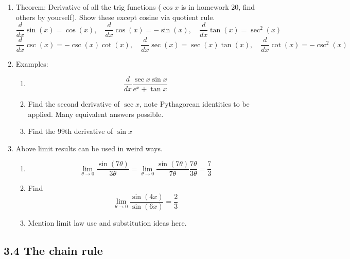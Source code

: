 \documentclass{article}
\begin{document}
\begin{enumerate}

\item Theorem: Derivative of all the trig functions ($\cos x$ is in homework 20, find others by yourself). Show these except cosine via quotient rule.
$$
\frac{d}{dx} \sin(x) = \cos(x), \quad
\frac{d}{dx} \cos(x) = -\sin(x), \quad
\frac{d}{dx} \tan(x) = \sec^2(x)
$$
$$
\frac{d}{dx} \csc(x) = -\csc(x)\cot(x), \quad
\frac{d}{dx} \sec(x) = \sec(x)\tan(x), \quad
\frac{d}{dx} \cot(x) = -\csc^2(x)
$$

\item Examples:
\begin{enumerate}
\item $$\frac{d}{dx}\frac{\sec x\sin x}{e^x+\tan x}$$
\item Find the second derivative of $\sec x$, note Pythagorean identities to be applied. Many equivalent answers possible.
\item Find the 99th derivative of $\sin x$
\end{enumerate}

\item Above limit results can be used in weird ways.
\begin{enumerate}
\item 
$$\lim_{\theta\rightarrow 0} \frac{\sin (7\theta)}{3\theta} = 
\lim_{\theta\rightarrow 0} \frac{\sin (7\theta)}{7\theta}\frac{7\theta}{3\theta} = \frac{7}{3}$$
\item Find 
$$\lim_{\theta\rightarrow 0} \frac{\sin(4x)}{\sin(6x)} = \frac{2}{3}$$
\item Mention limit law use and substitution ideas here.
\end{enumerate}
\end{enumerate}


\subsection{3.4 The chain rule}
\end{document}
